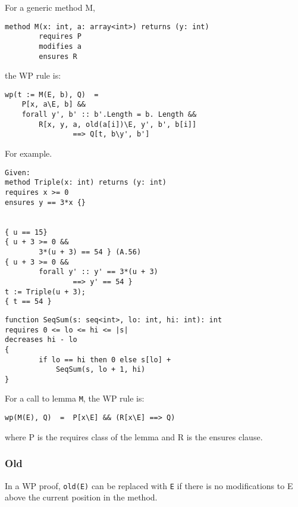 For a generic method M,
\begin{verbatim}
method M(x: int, a: array<int>) returns (y: int) 
        requires P
        modifies a
        ensures R
\end{verbatim}
the WP rule is:
\begin{verbatim}
wp(t := M(E, b), Q)  =  
    P[x, a\E, b] && 
    forall y', b' :: b'.Length = b. Length &&
        R[x, y, a, old(a[i])\E, y', b', b[i]] 
                ==> Q[t, b\y', b']
\end{verbatim}
For example.
\begin{verbatim}
Given:
method Triple(x: int) returns (y: int)
requires x >= 0
ensures y == 3*x {}


{ u == 15}
{ u + 3 >= 0 &&
        3*(u + 3) == 54 } (A.56)
{ u + 3 >= 0 &&
        forall y' :: y' == 3*(u + 3)
                ==> y' == 54 }
t := Triple(u + 3);
{ t == 54 }

\end{verbatim}
\begin{verbatim}
function SeqSum(s: seq<int>, lo: int, hi: int): int
requires 0 <= lo <= hi <= |s|
decreases hi - lo
{
        if lo == hi then 0 else s[lo] +
            SeqSum(s, lo + 1, hi)
}
\end{verbatim}

For a call to lemma \verb!M!, the WP rule is:
\begin{verbatim}
wp(M(E), Q)  =  P[x\E] && (R[x\E] ==> Q)
\end{verbatim}
where P is the requires class of the lemma and R is the ensures clause.

\subsubsection{Old}
In a WP proof, \verb!old(E)! can be replaced with \verb!E! 
if there is no modifications to E above the current position in the method.
